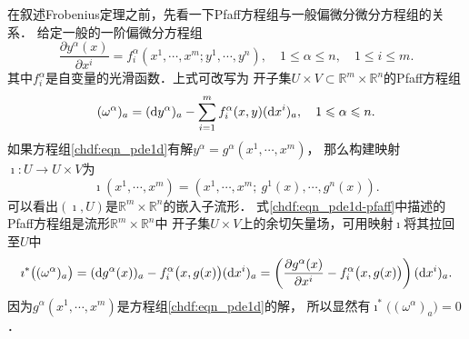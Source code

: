 在叙述Frobenius定理之前，先看一下Pfaff方程组与一般偏微分微分方程组的关系．
给定一般的一阶偏微分方程组
\begin{equation}\label{chdf:eqn_pde1d}
    \frac{\partial y^\alpha(x)}{\partial x^i} = f_i ^\alpha (x^1,\cdots, x^m;y^1,\cdots,y^n),
    \quad 1 \leqslant \alpha \leqslant n, \quad 1 \leqslant i \leqslant m .
\end{equation}
其中$f_i ^\alpha$是自变量的光滑函数．上式可改写为
开子集$U\times V\subset \mathbb{R}^m\times \mathbb{R}^n$的Pfaff方程组
\begin{equation}\label{chdf:eqn_pde1d-pfaff}
    (\omega^\alpha)_a = ({\rm d}y^\alpha)_a - \sum_{i=1}^{m}f_i ^\alpha(x,y)({\rm d}x^i)_a,
     \quad 1 \leqslant \alpha \leqslant n.
\end{equation}
如果方程组\eqref{chdf:eqn_pde1d}有解$y^\alpha=g^\alpha(x^1,\cdots, x^m)$，
那么构建映射$\imath:U\to U\times V$为
\begin{equation}
    \imath(x^1,\cdots, x^m)=\left(x^1,\cdots, x^m;\ g^1(x),\cdots,g^n(x)\right).
\end{equation}
可以看出$(\imath,U)$是$\mathbb{R}^m\times \mathbb{R}^n$的嵌入子流形．
式\eqref{chdf:eqn_pde1d-pfaff}中描述的Pfaff方程组是流形$\mathbb{R}^m\times \mathbb{R}^n$中
开子集$U\times V$上的余切矢量场，可用映射$\imath$将其拉回至$U$中
\begin{equation*}
    \imath^*\bigl((\omega^\alpha)_a\bigr)=({\rm d}g^\alpha(x))_a - f_i ^\alpha\bigl(x,g(x)\bigr)({\rm d}x^i)_a
    =\left( \frac{\partial g^\alpha(x)}{\partial x^i} -f_i ^\alpha\bigl(x,g(x)\bigr) \right)({\rm d}x^i)_a .
\end{equation*}
因为$g^\alpha(x^1,\cdots, x^m)$是方程组\eqref{chdf:eqn_pde1d}的解，
所以显然有$\imath^*\bigl((\omega^\alpha)_a\bigr)=0$．



